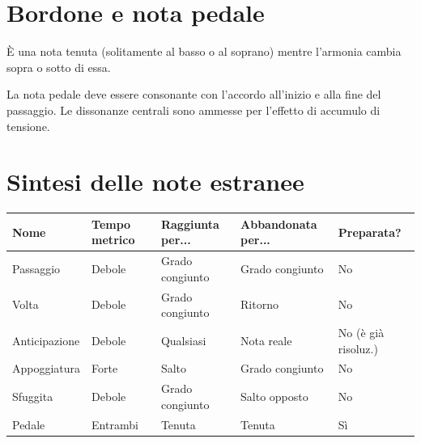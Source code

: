 \section{Bordone e nota pedale}
\label{sec:pedale}

\begin{definizione}
    È una nota tenuta (solitamente al basso o al soprano) mentre l'armonia cambia sopra o sotto di essa.
\end{definizione}

\begin{regola}
    La nota pedale deve essere consonante con l'accordo all'inizio e alla fine del passaggio. Le dissonanze centrali sono ammesse per l'effetto di accumulo di tensione.
\end{regola}

\section{Sintesi delle note estranee}
\label{sec:sintesi_note_estranee}

\begin{center}
\begin{tabular}{|l|l|l|l|l|}
\hline
Nome & Tempo metrico & Raggiunta per... & Abbandonata per... & Preparata? \\
\hline
Passaggio & Debole & Grado congiunto & Grado congiunto & No \\
Volta & Debole & Grado congiunto & Ritorno & No \\
Anticipazione & Debole & Qualsiasi & Nota reale & No (è già risoluz.) \\
Appoggiatura & Forte & Salto & Grado congiunto & No \\
Sfuggita & Debole & Grado congiunto & Salto opposto & No \\
Pedale & Entrambi & Tenuta & Tenuta & Sì \\
\hline
\end{tabular}
\end{center}

\begin{esempio}
\end{esempio}

\begin{esempio}
\end{esempio}
